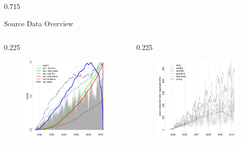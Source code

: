 \documentclass[final]{beamer} %
\newcommand{\spaceProp}{0.02}
\newcommand{\spacer}{\begin{column}{\spaceProp\paperwidth}\end{column}}
\newenvironment{oneCol}{\begin{column}[t]{0.225\paperwidth}}{\end{column}}
\newenvironment{threeCol}{\begin{column}[t]{0.715\paperwidth}}{\end{column}}
\begin{document}
\begin{frame}{}
\begin{columns}[t]
\begin{threeCol}
\begin{block}{Source Data Overview}
\begin{columns}
\begin{oneCol}
\begin{figure}
        \includegraphics[width=1.0\linewidth]{dataReview.png}
      \end{figure}   
    \end{oneCol}
    \begin{oneCol}
      \begin{figure}
        \includegraphics[width=1.0\linewidth]{maxComp.png}

\end{figure}
\end{oneCol}
\end{columns}
\end{block}
\end{threeCol}
\end{columns}
\end{frame}
\end{document}
